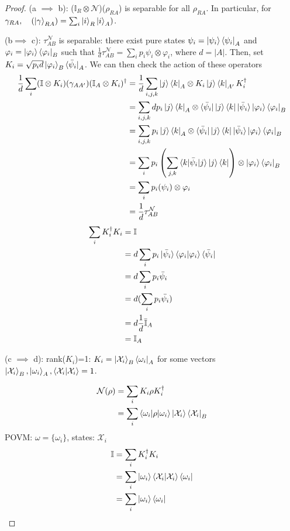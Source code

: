 \documentclass[10pt,oneside,longbibliography]{report}
\begin{document}
\begin{proof} 
(a $\implies$ b): ($\mathbb{I}_R\otimes \mathcal{N}$)($\rho_{RA}$) is separable for all $\rho_{RA}$. In particular, for $\gamma_{RA}, \quad (\ket{\gamma}_{RA})=\sum_i \ket{i}_R \ket{i}_A)$.

(b$\implies$ c): $\tau_{AB}^{\mathcal{N}}$ is separable: there exist pure states $\psi_i = \ket{\psi_i}\bra{\psi_i}_A$ and $\varphi_i = \ket{\varphi_i}\bra{\varphi_i}_B$ such that $\frac{1}{d} \tau^{\mathcal{N}}_{AB}=\sum_i p_i \psi_i \otimes \varphi_i$, where $d=|A|$. Then, set $K_i = \sqrt{p_i d}\ket{\varphi_i}_B \bra{\bar{\psi}_i}_A$. We can then check the action of these operators
\begin{align}
    \frac{1}{d} \sum_i (\mathbb{I}\otimes K_i) (\gamma_{AA'})(\mathbb{I}_A \otimes K_i)^{\dagger}&= \frac{1}{d} \sum_{i,j,k} \ket{j}\bra{k}_A \otimes K_i \ket{j}\bra{k}_{A'} K_i^{\dagger} \\
    &= \sum_{i,j,k} d p_i \ket{j}\bra{k}_A \otimes \bra{\bar{\psi}_i}\ket{j}\bra{k}\ket{\bar{\psi}_i} \ket{\varphi_i}\bra{\varphi_i}_B\\
    &=\sum_{i,j,k} p_i \ket{j}\bra{k}_A \otimes \bra{\bar{\psi}_i}\ket{j}\bra{k}\ket{\bar{\psi}_i} \ket{\varphi_i}\bra{\varphi_i}_B\\
    &=\sum_i p_i \left(\sum_{j,k} \braket{k | \bar{\psi}_i | j} \ket{j} \bra{k}\right)\otimes \ket{\varphi_i}\bra{\varphi_i}_B\\
    &=\sum_i p_i (\psi_i) \otimes \varphi_i \\
    &= \frac{1}{d} \tau_{AB}^{\mathcal{N}}
\end{align}
\begin{align}
    \sum_{i} K_i^{\dagger} K_i &=\mathbb{I} \\
   &= d \sum_i p_i \ket{\bar{\psi}_i} \braket{\varphi_i | \varphi_i}\bra{\bar{\psi}_i}\\
    &= d \sum_i p_i \bar{\psi}_i \\
    &= d(\sum_i p_i \bar{\psi_i})\\
    &=d \frac{1}{d} \bar{\mathbb{I}}_A\\
    &= \mathbb{I}_A
\end{align}

(c $\implies$ d): rank($K_i$)=1: $K_i = \ket{\mathcal{X}_i}_B \bra{\omega_i}_A$ for some vectors $\ket{\mathcal{X}_i}_B ,\ket{\omega_i}_A, \braket{\mathcal{X}_i |\mathcal{X}_i}=1$.

\begin{align}
    \mathcal{N} (\rho) &= \sum_i K_i \rho K_i^{\dagger} \\
    &= \sum_i \braket{\omega_i | \rho | \omega_i} \ket{\mathcal{X}_i} \bra{\mathcal{X}_i}_B 
\end{align}
POVM: $\omega = \{\omega_i\}$, states: $\mathcal{X}_i$
\begin{align}
    \mathbb{I} &= \sum_i K_i^{\dagger}K_i \\
    &= \sum_i \ket{\omega_i} \braket{\mathcal{X}_i | \mathcal{X}_i}\bra{\omega_i} \\
    &= \sum_i \ket{\omega_i}\bra{\omega_i}
\end{align}
 

\end{proof}
\end{document}
